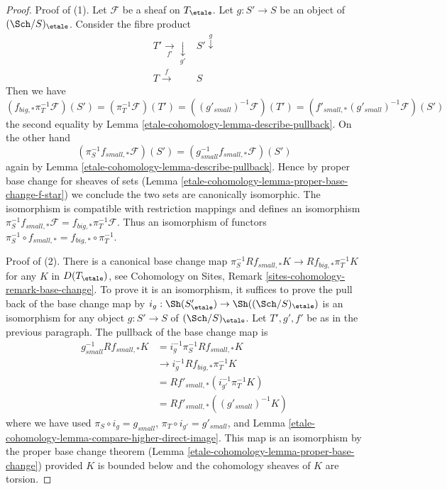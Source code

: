 \begin{proof}
Proof of (1). Let $\mathcal{F}$ be a sheaf on $T_\etale$.
Let $g : S' \to S$ be an object of $(\Sch/S)_\etale$. Consider the
fibre product
$$
\begin{array}{cc}T' \underset{f'}{\longrightarrow}\underset{g'}{\downarrow} & S' \overset{g}{\downarrow} \\ T \overset{f}{\longrightarrow} & S\end{array}
$$
Then we have
$$
(f_{big, *}\pi_T^{-1}\mathcal{F})(S') =
(\pi_T^{-1}\mathcal{F})(T') =
((g'_{small})^{-1}\mathcal{F})(T')  =
(f'_{small, *}(g'_{small})^{-1}\mathcal{F})(S')
$$
the second equality by Lemma \ref{etale-cohomology-lemma-describe-pullback}.
On the other hand
$$
(\pi_S^{-1}f_{small, *}\mathcal{F})(S') =
(g_{small}^{-1}f_{small, *}\mathcal{F})(S')
$$
again by Lemma \ref{etale-cohomology-lemma-describe-pullback}.
Hence by proper base change for sheaves of sets
(Lemma \ref{etale-cohomology-lemma-proper-base-change-f-star})
we conclude the two sets are canonically isomorphic.
The isomorphism is compatible with restriction mappings
and defines an isomorphism
$\pi_S^{-1}f_{small, *}\mathcal{F} = f_{big, *}\pi_T^{-1}\mathcal{F}$.
Thus an isomorphism of functors
$\pi_S^{-1} \circ f_{small, *} = f_{big, *} \circ \pi_T^{-1}$.

\medskip\noindent
Proof of (2). There is a canonical base change map
$\pi_S^{-1}Rf_{small, *}K \to Rf_{big, *}\pi_T^{-1}K$
for any $K$ in $D(T_\etale)$, see
Cohomology on Sites, Remark \ref{sites-cohomology-remark-base-change}.
To prove it is an isomorphism, it suffices to prove the pull back of
the base change map by $i_g : \Sh(S'_\etale) \to \Sh((\Sch/S)_\etale)$
is an isomorphism for any object $g : S' \to S$ of $(\Sch/S)_\etale$.
Let $T', g', f'$ be as in the previous paragraph.
The pullback of the base change map is
\begin{align*}
g_{small}^{-1}Rf_{small, *}K
& =
i_g^{-1}\pi_S^{-1}Rf_{small, *}K \\
& \to
i_g^{-1}Rf_{big, *}\pi_T^{-1}K \\
& =
Rf'_{small, *}(i_{g'}^{-1}\pi_T^{-1}K) \\
& =
Rf'_{small, *}((g'_{small})^{-1}K)
\end{align*}
where we have used $\pi_S \circ i_g = g_{small}$,
$\pi_T \circ i_{g'} = g'_{small}$, and
Lemma \ref{etale-cohomology-lemma-compare-higher-direct-image}.
This map is an isomorphism by the proper base change theorem
(Lemma \ref{etale-cohomology-lemma-proper-base-change}) provided $K$ is bounded
below and the cohomology sheaves of $K$ are torsion.


\end{proof}
